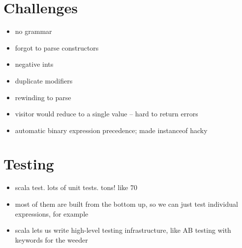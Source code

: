 \documentclass{article}
\begin{document}
\section{Challenges}

\begin{itemize}
    \item no grammar
    \item forgot to parse constructors
    \item negative ints
    \item duplicate modifiers
    \item rewinding to parse
    \item visitor would reduce to a single value -- hard to return errors
    \item automatic binary expression precedence; made instanceof hacky
\end{itemize}




\section{Testing}

\begin{itemize}
    \item scala test. lots of unit tests. tons! like 70
    \item most of them are built from the bottom up, so we can just test individual expressions, for example
    \item scala lets us write high-level testing infrastructure, like AB testing with keywords for the weeder
\end{itemize}
\end{document}
